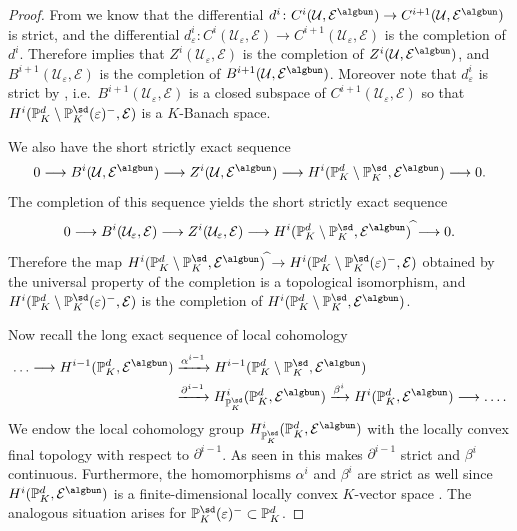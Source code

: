 \documentclass[a4paper, reqno, 10pt]{amsart}
\theoremstyle{definition}
\numberwithin{equation}{section}
\newcommand{\cpltn}{{\,\widehat{}}}
\newcommand{\lra}{\longrightarrow}
\newcommand{\ra}{\rightarrow}
\newcommand{\BP}{{\mathbb {P}}}
\newcommand{\CE}{{\mathcal {E}}}
\newcommand{\CU}{{\mathcal {U}}}
\begin{document}
\begin{proof}
	
	From  we know that the differential $d^i \colon C^i (\CU,\CE^\algbun) \ra C^{i+1} (\CU,\CE^\algbun)$ is strict, and the differential $d^i_{\varepsilon} \colon C^i(\CU_{\varepsilon},\CE) \ra C^{i+1}(\CU_{\varepsilon},\CE)$ is the completion of $d^i$.
	Therefore \cite[1.1.9 Prop.\ 5]{BoschGuentzerRemmert84NonArchAna} implies that $Z^i(\CU_{\varepsilon},\CE)$ is the completion of $Z^i (\CU, \CE^\algbun)$, and $B^{i+1} (\CU_{\varepsilon}, \CE)$ is the completion of $B^{i+1}(\CU, \CE^\algbun)$.
	Moreover note that $d^i_{\varepsilon}$ is strict by \cite[1.1.9 Prop.\ 4]{BoschGuentzerRemmert84NonArchAna}, i.e.\ $B^{i+1} (\CU_{\varepsilon}, \CE)$ is a closed subspace of $C^{i+1}(\CU_{\varepsilon},\CE)$ so that $H^i (\BP^d_K \setminus \BP_K^\sd (\varepsilon)^-,\CE)$ is a $K$-Banach space.
	
	
	We also have the short strictly exact sequence
	\begin{equation*}
		0 \lra B^i(\CU,\CE^\algbun) \lra Z^i (\CU, \CE^\algbun) \lra H^i (\BP_K^d \setminus \BP_K^\sd , \CE^\algbun) \lra 0 .
	\end{equation*}
	The completion of this sequence yields the short strictly exact sequence \cite[1.1.9 Cor.\ 6]{BoschGuentzerRemmert84NonArchAna}
	\begin{equation*}
		0 \lra B^{i} (\CU_{\varepsilon}, \CE) \lra Z^i(\CU_{\varepsilon},\CE) \lra H^i (\BP_K^d \setminus \BP_K^\sd , \CE^\algbun)^{\cpltn} \lra 0 .
	\end{equation*}
	Therefore the map $H^i (\BP_K^d \setminus \BP_K^\sd , \CE^\algbun)^\cpltn \ra H^i (\BP^d_K \setminus \BP_K^\sd (\varepsilon)^-,\CE)$ obtained by the universal property of the completion is a topological isomorphism, and $ H^i (\BP^d_K \setminus \BP_K^\sd (\varepsilon)^-,\CE)$ is the completion of $H^i (\BP_K^d \setminus \BP_K^\sd , \CE^\algbun)$.
	
	
	Now recall the long exact sequence of local cohomology
	\begin{equation}\label{Eq 2 - Long exact sequence of local cohomology for algebraic cohomology}
		\begin{aligned}
			\ldots \lra  H^{i-1} (\BP^d_K,\CE^\algbun) &\xrightarrow{\alpha^{i-1}}  H^{i-1}(\BP_K^d\setminus \BP^\sd_K,\CE^\algbun)\\
			&\xrightarrow{\partial^{i-1}}  H^i_{\BP_K^\sd} (\BP^d_K, \CE^\algbun) \xrightarrow{\beta^i} H^i(\BP^d_K,\CE^\algbun) \lra \ldots .
		\end{aligned}
	\end{equation}
	We endow the local cohomology group $H^i_{\BP_K^\sd} (\BP^d_K, \CE^\algbun)$ with the locally convex final topology with respect to $\partial^{i-1}$.
	As seen in  this makes $\partial^{i-1}$ strict and $\beta^i$ continuous.
	Furthermore, the homomorphisms $\alpha^i$ and $\beta^i$ are strict as well since $H^i (\BP_K^d, \CE^\algbun)$ is a finite-dimensional locally convex $K$-vector space \cite[Cor.\ 3.4.25]{PerezGarciaSchikhof10LocConvSpNonArch}.
	The analogous situation arises for $\BP^\sd_K (\varepsilon)^- \subset \BP_K^d$.
	

\end{proof}
\end{document}

